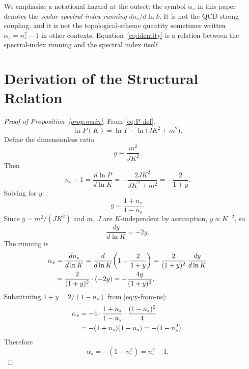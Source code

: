\documentclass[12pt]{article}
\theoremstyle{definition}
\theoremstyle{remark}
\begin{document}
We emphasize a notational hazard at the outset: the symbol $\alpha_s$ in this paper denotes the \emph{scalar spectral-index running} $dn_s/d\ln k$. It is not the QCD strong coupling, and it is not the topological-scheme quantity sometimes written $\alpha_s = n_s^2 - 1$ in other contexts. Equation~\eqref{eq:identity} is a relation between the spectral-index running and the spectral index itself.

\section{Derivation of the Structural Relation}\label{sec:derivation}

\begin{proof}[Proof of Proposition~\ref{prop:main}]
From \eqref{eq:P-def},
\begin{equation}\label{eq:lnP}
  \ln P(K) = \ln T - \ln\bigl(J K^2 + m^2\bigr).
\end{equation}
Define the dimensionless ratio
\begin{equation}\label{eq:y-def}
  y \equiv \frac{m^2}{J K^2}.
\end{equation}
Then
\begin{equation}\label{eq:ns-from-y}
  n_s - 1 = \frac{d\ln P}{d\ln K} = -\frac{2 J K^2}{J K^2 + m^2} = -\frac{2}{1 + y}.
\end{equation}
Solving for $y$:
\begin{equation}\label{eq:y-from-ns}
  y = \frac{1 + n_s}{1 - n_s}.
\end{equation}
Since $y = m^2/(JK^2)$ and $m$, $J$ are $K$-independent by assumption, $y \propto K^{-2}$, so
\begin{equation}\label{eq:dlny}
  \frac{dy}{d\ln K} = -2y.
\end{equation}
The running is
\begin{align}\label{eq:alpha-calc}
  \alpha_s &= \frac{dn_s}{d\ln K} = \frac{d}{d\ln K}\!\left(1 - \frac{2}{1+y}\right) = \frac{2}{(1+y)^2}\,\frac{dy}{d\ln K} \notag\\
  &= \frac{2}{(1+y)^2}\cdot(-2y) = -\frac{4y}{(1+y)^2}.
\end{align}
Substituting $1 + y = 2/(1-n_s)$ from \eqref{eq:y-from-ns}:
\begin{align}
  \alpha_s &= -4\cdot\frac{1+n_s}{1-n_s}\cdot\frac{(1-n_s)^2}{4} \notag\\
  &= -(1+n_s)(1-n_s) = -(1-n_s^2).
\end{align}
Therefore
\begin{equation}\label{eq:final}
  \boxed{\alpha_s = -(1 - n_s^2) = n_s^2 - 1.}
\end{equation}
\end{proof}
\end{document}
